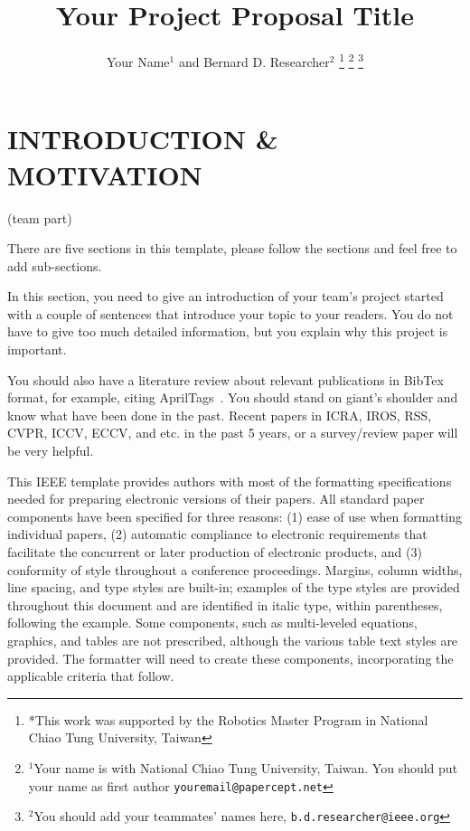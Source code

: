 \documentclass[letterpaper, 10 pt, conference]{ieeeconf}  %
\title{\LARGE \bf
Your Project Proposal Title
}
\author{Your Name$^{1}$ and Bernard D. Researcher$^{2}$%
\thanks{*This work was supported by the Robotics Master Program in National Chiao Tung University, Taiwan}%
\thanks{$^{1}$Your name is with National Chiao Tung University, Taiwan. You should put your name as first author
        {\tt\small youremail@papercept.net}}%
\thanks{$^{2}$You should add your teammates' names here,
        {\tt\small b.d.researcher@ieee.org}}%
}
\begin{document}
\maketitle
\thispagestyle{empty}
\pagestyle{empty}


\section{INTRODUCTION \& MOTIVATION}

(team part)

There are five sections in this template, please follow the sections and feel free to add sub-sections. 

In this section, you need to give an introduction of your team's project started with a couple of sentences that introduce your topic to your readers. You do not have to give too much detailed information, but you explain why this project is important.

You should also have a literature review about relevant publications in BibTex format, for example, citing AprilTags~\cite{Olson09icra}. You should stand on giant's shoulder and know what have been done in the past. Recent papers in ICRA, IROS, RSS, CVPR, ICCV, ECCV, and etc. in the past 5 years, or a survey/review paper will be very helpful.

This IEEE template provides authors with most of the formatting specifications needed for preparing electronic versions of their papers. All standard paper components have been specified for three reasons: (1) ease of use when formatting individual papers, (2) automatic compliance to electronic requirements that facilitate the concurrent or later production of electronic products, and (3) conformity of style throughout a conference proceedings. Margins, column widths, line spacing, and type styles are built-in; examples of the type styles are provided throughout this document and are identified in italic type, within parentheses, following the example. Some components, such as multi-leveled equations, graphics, and tables are not prescribed, although the various table text styles are provided. The formatter will need to create these components, incorporating the applicable criteria that follow.
\end{document}
